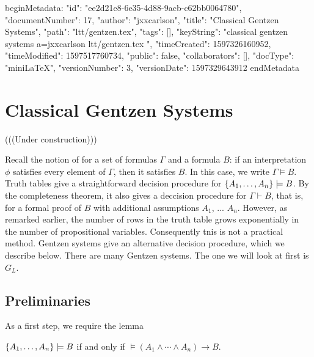 beginMetadata:
{
    "id": "ee2d21e8-6e35-4d88-9acb-c62bb0064780",
    "documentNumber": 17,
    "author": "jxxcarlson",
    "title": "Classical Gentzen Systems",
    "path": "ltt/gentzen.tex",
    "tags": [],
    "keyString": "classical gentzen systems a=jxxcarlson ltt/gentzen.tex ",
    "timeCreated": 1597326160952,
    "timeModified": 1597517760734,
    "public": false,
    "collaborators": [],
    "docType": "miniLaTeX",
    "versionNumber": 3,
    "versionDate": 1597329643912
}
endMetadata

\begin{mathmacro}
\newcommand{\set}[1]{\{ #1 \}}
\end{mathmacro}


\section{Classical Gentzen Systems}

(((Under construction)))

\innertableofcontents

Recall the notion of  for a set of formulas $\Gamma$ and a formula $B$: if an interpretation $\phi$ satisfies every element of $\Gamma$, then it satisfies $B$.  In this case, we write $\Gamma \models B$.  Truth tables give a straightforward decision procedure for $\set{A_1, \ldots, A_n} \models B$. By the completeness theorem, it also gives a deccision procedure for $\Gamma \vdash B$, that is, for a formal proof of $B$ with additional assumptions $A_1$, ... $A_n$. However, as remarked earlier, the number of rows in the truth table grows exponentially in the number of propositional variables.  Consequently tnis is not a practical method.  Gentzen systems give an alternative decision procedure, which we describe below.  There are many Gentzen systems.  The one we will look at first is $G_L$.




\subsection{Preliminaries}

As a first step, we require the lemma

\begin{lemma}
$\set{A_1, \ldots, A_n} \models B$ if and only if $\models (A_1 \land \cdots \land A_n) \to B$.
\end{lemma}


